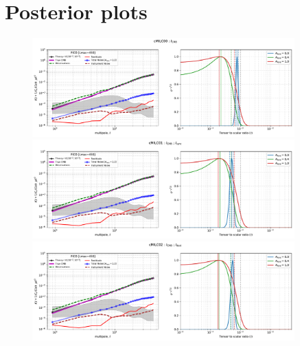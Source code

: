\documentclass[11pt]{article}
\begin{document}
\section{Posterior plots}
\begin{figure}
\centering
\includegraphics[width=0.9\textwidth]{ps_and_bbposterir_cMILC00.pdf}
\includegraphics[width=0.9\textwidth]{ps_and_bbposterir_cMILC01.pdf}
\includegraphics[width=0.9\textwidth]{ps_and_bbposterir_cMILC02.pdf}
\end{figure}
\end{document}
